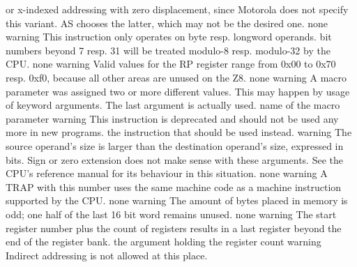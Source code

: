 \documentclass[12pt,twoside]{report}
\begin{document}
\begin{description}
{                or x-indexed addressing with zero displacement, since
                Motorola does not specify this variant.  AS chooses the
                latter, which may not be the desired one.}
               {none}
               {warning}
               {This instruction only operates on byte resp. longword
                operands.  bit numbers beyond 7 resp. 31 will be treated
                modulo-8 resp. modulo-32 by the CPU.}
               {none}
               {warning}
               {Valid values for the RP register range from 0x00 to 0x70 resp.
                0xf0, because all other areas are unused on the Z8.}
               {none}
               {warning}
               {A macro parameter was assigned two or more
                different values.  This may happen by usage of
                keyword arguments.  The last argument is actually
                used.}
               {name of the macro parameter}
               {warning}
               {This instruction is deprecated and should not be used any
                more in new programs.}
               {the instruction that should be used instead.}
               {warning}
               {The source operand's size is larger than the destination operand's
                size, expressed in bits.  Sign or zero extension does not make sense
                with these arguments.  See the CPU's reference manual for its behaviour
                in this situation.}
               {none}
               {warning}
               {A TRAP with this number uses the same machine code as a 
                machine instruction supported by the CPU.}
               {none}
               {warning}
               {The amount of bytes placed in memory is odd; one half of the last
                16 bit word remains unused.}
               {none}
               {warning}
               {The start register number plus the count of registers results
                in a last register beyond the end of the register bank.}
               {the argument holding the register count}
               {warning}
               {Indirect addressing is not allowed at this place.
}
\end{description}
\end{document}
